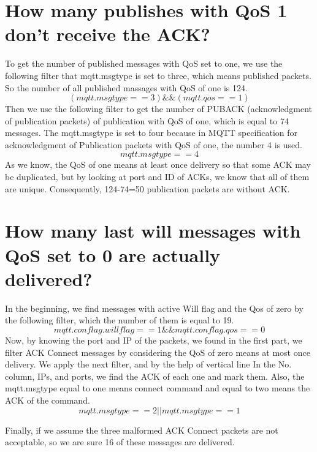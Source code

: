 \documentclass[10pt,english, openany]{book}
\begin{document}
\section{How many publishes with QoS 1 don’t receive the ACK?}

To get the number of published messages with QoS set to one, we use the following filter that mqtt.msgtype is set to three, which means published packets. So the number of all published massages with QoS of one is 124.
\begin{equation*}(mqtt.msgtype == 3) \&\& (mqtt.qos == 1)\end{equation*}
Then we use the following filter to get the number of PUBACK (acknowledgment of publication packets) of publication with QoS of one, which is equal to 74 messages. The mqtt.msgtype is set to four because in MQTT specification for acknowledgment of Publication packets with QoS of one, the number 4 is used.
\begin{equation*}mqtt.msgtype == 4\end{equation*}
As we know, the QoS of one means at least once delivery so that some ACK may be duplicated, but by looking at port and ID of ACKs, we know that all of them are unique. Consequently, 124-74=50 publication packets are without ACK.

\section{How many last will messages with QoS set to 0 are actually delivered?}
In the beginning, we find messages with active Will flag and the Qos of zero by the following filter, which the number of them is equal to 19.
\begin{equation*}mqtt.conflag.willflag==1 \&\& mqtt.conflag.qos==0\end{equation*}
Now, by knowing the port and IP of the packets, we found in the first part, we filter ACK Connect messages by considering the QoS of zero means at most once delivery. 
We apply the next filter, and by the help of vertical line In the No. column, IPs, and ports, we find the ACK of each one and mark them. Also, the mqtt.msgtype equal to one means connect command and equal to two means the ACK of the command.
\begin{equation*}mqtt.msgtype==2 || mqtt.msgtype==1\end{equation*}

Finally, if we assume the three malformed ACK Connect packets are not acceptable, so we are sure 16 of these messages are delivered.
\end{document}
